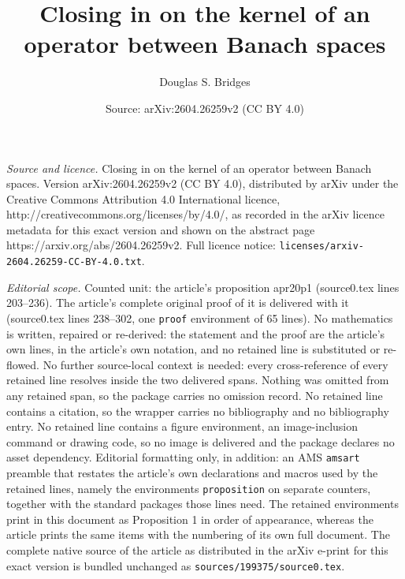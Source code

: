 \documentclass[10pt,a4paper]{amsart}
\title{\textsf{Closing in on the kernel of an operator between Banach spaces}}
\author{Douglas S. Bridges}
\date{Source: arXiv:2604.26259v2 (CC BY 4.0)}
\begin{document}
\maketitle

\noindent\emph{Source and licence.} \textsf{Closing in on the kernel of an operator between Banach spaces}. Version arXiv:2604.26259v2 (CC BY 4.0), distributed by arXiv under the Creative Commons Attribution 4.0 International licence, http://creativecommons.org/licenses/by/4.0/, as recorded in the arXiv licence metadata for this exact version and shown on the abstract page https://arxiv.org/abs/2604.26259v2. Full licence notice: \texttt{licenses/arxiv-2604.26259-CC-BY-4.0.txt}.\par\smallskip

\noindent\textit{Editorial scope.} Counted unit: the article's proposition apr20p1 (source0.tex lines 203--236). The article's complete original proof of it is delivered with it (source0.tex lines 238--302, one \texttt{proof} environment of 65 lines). No mathematics is written, repaired or re-derived: the statement and the proof are the article's own lines, in the article's own notation, and no retained line is substituted or re-flowed.  No further source-local context is needed: every cross-reference of every retained line resolves inside the two delivered spans.  Nothing was omitted from any retained span, so the package carries no omission record.  No retained line contains a citation, so the wrapper carries no bibliography and no bibliography entry.  No retained line contains a figure environment, an image-inclusion command or drawing code, so no image is delivered and the package declares no asset dependency.  Editorial formatting only, in addition: an AMS \texttt{amsart} preamble that restates the article's own declarations and macros used by the retained lines, namely the environments \texttt{proposition} on separate counters, together with the standard packages those lines need.  The retained environments print in this document as Proposition 1 in order of appearance, whereas the article prints the same items with the numbering of its own full document.  The complete native source of the article as distributed in the arXiv e-print for this exact version is bundled unchanged as \texttt{sources/199375/source0.tex}.
\end{document}
